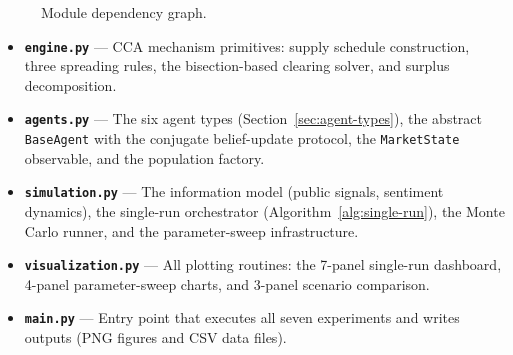 \documentclass[11pt,a4paper]{article}
\begin{document}
\begin{figure}[h]
\centering
{}
\caption{Module dependency graph.}
\label{fig:architecture}
\end{figure}

\begin{itemize}[nosep]
  \item \textbf{\texttt{engine.py}} --- CCA mechanism primitives: supply schedule construction, three spreading rules, the bisection-based clearing solver, and surplus decomposition.
  \item \textbf{\texttt{agents.py}} --- The six agent types (Section~\ref{sec:agent-types}), the abstract \texttt{BaseAgent} with the conjugate belief-update protocol, the \texttt{MarketState} observable, and the population factory.
  \item \textbf{\texttt{simulation.py}} --- The information model (public signals, sentiment dynamics), the single-run orchestrator (Algorithm~\ref{alg:single-run}), the Monte Carlo runner, and the parameter-sweep infrastructure.
  \item \textbf{\texttt{visualization.py}} --- All plotting routines: the 7-panel single-run dashboard, 4-panel parameter-sweep charts, and 3-panel scenario comparison.
  \item \textbf{\texttt{main.py}} --- Entry point that executes all seven experiments and writes outputs (PNG figures and CSV data files).
\end{itemize}
\end{document}
